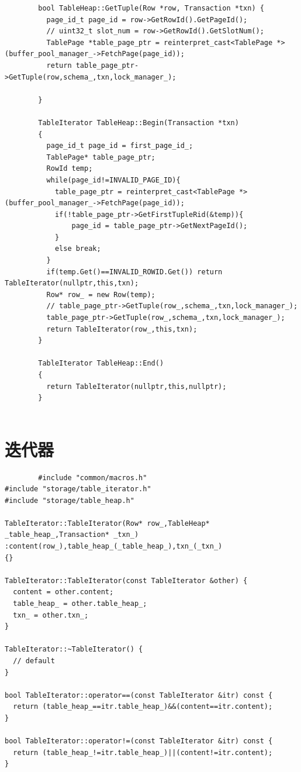 \documentclass{article}
\begin{document}
\begin{appendices}
\begin{lstlisting}
        bool TableHeap::GetTuple(Row *row, Transaction *txn) { 
          page_id_t page_id = row->GetRowId().GetPageId();
          // uint32_t slot_num = row->GetRowId().GetSlotNum();
          TablePage *table_page_ptr = reinterpret_cast<TablePage *>(buffer_pool_manager_->FetchPage(page_id));
          return table_page_ptr->GetTuple(row,schema_,txn,lock_manager_);
        
        }
        
        TableIterator TableHeap::Begin(Transaction *txn) 
        { 
          page_id_t page_id = first_page_id_;
          TablePage* table_page_ptr;
          RowId temp;
          while(page_id!=INVALID_PAGE_ID){
            table_page_ptr = reinterpret_cast<TablePage *>(buffer_pool_manager_->FetchPage(page_id));
            if(!table_page_ptr->GetFirstTupleRid(&temp)){
                page_id = table_page_ptr->GetNextPageId();
            }
            else break;
          }
          if(temp.Get()==INVALID_ROWID.Get()) return TableIterator(nullptr,this,txn);
          Row* row_ = new Row(temp);
          // table_page_ptr->GetTuple(row_,schema_,txn,lock_manager_);
          table_page_ptr->GetTuple(row_,schema_,txn,lock_manager_);
          return TableIterator(row_,this,txn); 
        }
        
        TableIterator TableHeap::End() 
        { 
          return TableIterator(nullptr,this,nullptr); 
        }
        
    \end{lstlisting}
    \section[3]{迭代器}
    \begin{lstlisting}
        #include "common/macros.h"
#include "storage/table_iterator.h"
#include "storage/table_heap.h"

TableIterator::TableIterator(Row* row_,TableHeap* _table_heap_,Transaction* _txn_) :content(row_),table_heap_(_table_heap_),txn_(_txn_)
{}

TableIterator::TableIterator(const TableIterator &other) {
  content = other.content;
  table_heap_ = other.table_heap_;
  txn_ = other.txn_;
}

TableIterator::~TableIterator() {
  // default
}

bool TableIterator::operator==(const TableIterator &itr) const {
  return (table_heap_==itr.table_heap_)&&(content==itr.content);
}

bool TableIterator::operator!=(const TableIterator &itr) const {
  return (table_heap_!=itr.table_heap_)||(content!=itr.content);
}


\end{lstlisting}
\end{appendices}
\end{document}
